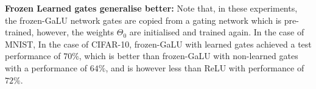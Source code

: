 \textbf{Frozen Learned gates generalise better:} Note that, in these experiments, the frozen-GaLU network gates are copied from a gating network which is pre-trained, however, the weights $\Theta_0$ are initialised and trained again.  In the case of MNIST, 
In the case of CIFAR-10, frozen-GaLU with learned gates achieved a test performance of $70\%$, which is better than frozen-GaLU with non-learned gates with a performance of  $64\%$, and is however less than ReLU with performance of $72\%$. 

\begin{figure}
\end{figure}
